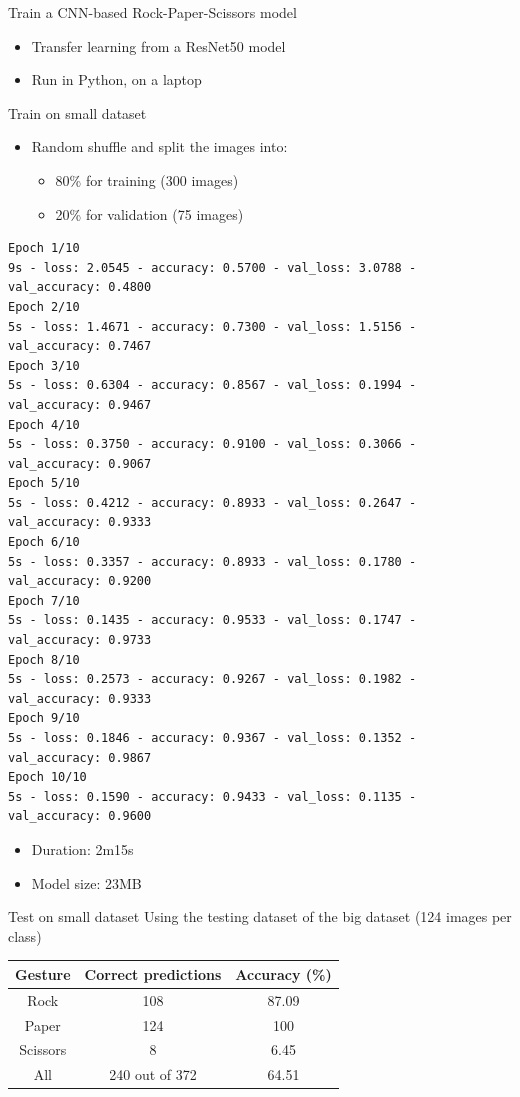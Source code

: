 \begin{frame}{Train a CNN-based Rock-Paper-Scissors model}
  \begin{itemize}
	\item Transfer learning from a ResNet50 model
	\item Run in Python, on a laptop
  \end{itemize}
\end{frame}

\begin{frame}[fragile]{Train on small dataset}
  \begin{itemize}
	\item Random shuffle and split the images into:
	\begin{itemize}
	  \item 80\% for training (300 images)
	  \item 20\% for validation (75 images)
	\end{itemize}
  \end{itemize}
  \lstset{basicstyle=\tiny, numbers=left}
  \begin{lstlisting}
Epoch 1/10
9s - loss: 2.0545 - accuracy: 0.5700 - val_loss: 3.0788 - val_accuracy: 0.4800
Epoch 2/10
5s - loss: 1.4671 - accuracy: 0.7300 - val_loss: 1.5156 - val_accuracy: 0.7467
Epoch 3/10
5s - loss: 0.6304 - accuracy: 0.8567 - val_loss: 0.1994 - val_accuracy: 0.9467
Epoch 4/10
5s - loss: 0.3750 - accuracy: 0.9100 - val_loss: 0.3066 - val_accuracy: 0.9067
Epoch 5/10
5s - loss: 0.4212 - accuracy: 0.8933 - val_loss: 0.2647 - val_accuracy: 0.9333
Epoch 6/10
5s - loss: 0.3357 - accuracy: 0.8933 - val_loss: 0.1780 - val_accuracy: 0.9200
Epoch 7/10
5s - loss: 0.1435 - accuracy: 0.9533 - val_loss: 0.1747 - val_accuracy: 0.9733
Epoch 8/10
5s - loss: 0.2573 - accuracy: 0.9267 - val_loss: 0.1982 - val_accuracy: 0.9333
Epoch 9/10
5s - loss: 0.1846 - accuracy: 0.9367 - val_loss: 0.1352 - val_accuracy: 0.9867
Epoch 10/10
5s - loss: 0.1590 - accuracy: 0.9433 - val_loss: 0.1135 - val_accuracy: 0.9600
  \end{lstlisting}
  \begin{itemize}
	\item Duration: 2m15s
	\item Model size: 23MB
  \end{itemize}
\end{frame}

\begin{frame}{Test on small dataset}
Using the testing dataset of the big dataset (124 images per class)
  \begin{table}
	\begin{tabular}{|c|c|c|}
	  \hline
		\textbf{Gesture} & \textbf{Correct predictions} & \textbf{Accuracy (\%)} \\
	  \hline
		Rock & 108 & 87.09 \\
	  \hline
		Paper & 124 & 100 \\
	  \hline
		Scissors & 8 & 6.45 \\
	  \hline
	  \hline
		All & 240 out of 372 & 64.51 \\
	  \hline
	\end{tabular}
  \end{table}
\end{frame}

